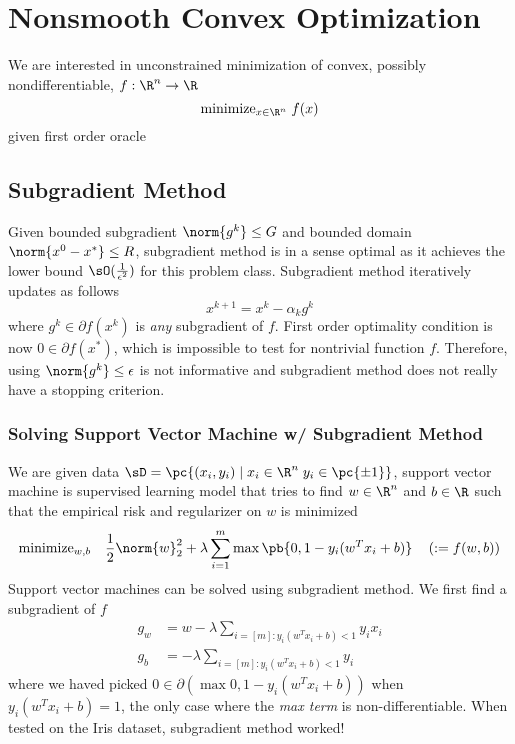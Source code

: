 \documentclass[11pt]{article}
\begin{document}
\section{Nonsmooth Convex Optimization}

We are interested in unconstrained minimization of convex, possibly nondifferentiable, $f:\R^n \to \R$ 
\[
    \text{minimize}_{x\in\R^n}\; f(x)
\]
given first order oracle

\subsection{Subgradient Method}

Given bounded subgradient $\norm{g^k}\leq G$ and bounded domain $\norm{x^0 - x^*} \leq R$, subgradient method is in a sense optimal as it achieves the lower bound $\sO(\frac{1}{\epsilon^2})$ for this problem class. Subgradient method iteratively updates as follows
\[
    x^{k+1}
        = x^k - \alpha_k g^k    
\]
where $g^k \in\partial f(x^k)$ is \textit{any} subgradient of $f$. First order optimality condition is now $0\in\partial f(x^*)$, which is impossible to test for nontrivial function $f$. Therefore, using $\norm{g^k}\leq \epsilon$ is not informative and subgradient method does not really have a stopping criterion.

\subsubsection{Solving Support Vector Machine w/ Subgradient Method}

We are given data $\sD = \pc{(x_i,y_i) \mid x_i\in\R^n \; y_i \in \pc{\pm 1}}$, support vector machine is supervised learning model that tries to find $w\in\R^n$ and $b\in\R$ such that the empirical risk and regularizer on $w$ is minimized
\begin{align*}
    \text{minimize}_{w,b} \quad
        \frac{1}{2} \norm{w}_2^2 + \lambda \sum_{i=1}^m \max\pb{0, 1 - y_i(w^Tx_i + b)} 
        \quad \left( := f(w,b) \right)
\end{align*}
Support vector machines can be solved using subgradient method. We first find a subgradient of $f$
\begin{align*}
    g_w
        &= w - \lambda \sum_{i=[m]: y_i(w^Tx_i + b) < 1 } y_i x_i \\
    g_b
        &= -\lambda \sum_{i=[m]: y_i(w^Tx_i + b) < 1 } y_i
\end{align*}
where we haved picked $0\in\partial (\max{0, 1- y_i(w^Tx_i + b)})$ when $y_i(w^Tx_i + b) = 1$, the only case where the \textit{max term} is non-differentiable. When tested on the Iris dataset, subgradient method worked!

\printbibliography 
\end{document}
